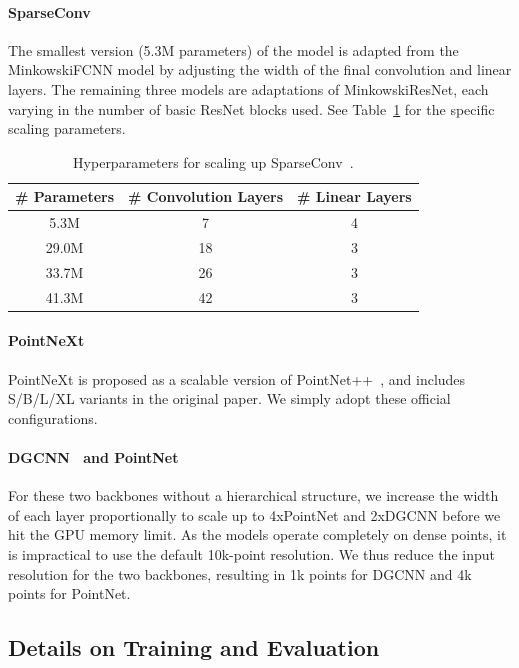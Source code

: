 \paragraph{SparseConv~\cite{choy20194d}} The smallest version (5.3M parameters) of the model is adapted from the MinkowskiFCNN model by adjusting the width of the final convolution and linear layers. The remaining three models are adaptations of MinkowskiResNet, each varying in the number of basic ResNet blocks used. See Table~\ref{tab:sparse_cov_scaling} for the specific scaling parameters.

\begin{table}[h]
  \centering
  \caption{Hyperparameters for scaling up SparseConv~\cite{choy20194d}.}
    \begin{tabular}{ccc}
    \toprule
    \# Parameters & \# Convolution Layers & \# Linear Layers \\
    \midrule
    5.3M  & 7     & 4 \\
    29.0M & 18    & 3 \\
    33.7M & 26    & 3 \\
    41.3M & 42    & 3 \\
    \bottomrule
    \end{tabular}%
  \label{tab:sparse_cov_scaling}%
\end{table}%

\paragraph{PointNeXt~\cite{qian2022pointnext}} PointNeXt is proposed as a scalable version of PointNet++~\cite{qi2017pointnet2}, and includes S/B/L/XL variants in the original paper. We simply adopt these official configurations.

\paragraph{DGCNN~\cite{wang2019dynamic} and PointNet~\cite{qi2017pointnet}} For these two backbones without a hierarchical structure, we increase the width of each layer proportionally to scale up to 4xPointNet and 2xDGCNN before we hit the GPU memory limit. As the models operate completely on dense points, it is impractical to use the default 10k-point resolution. We thus reduce the input resolution for the two backbones, resulting in 1k points for DGCNN and 4k points for PointNet.

\subsection{Details on Training and Evaluation}

